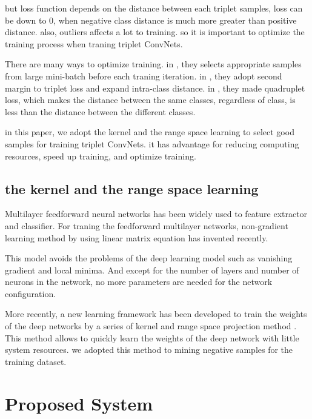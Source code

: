 \documentclass[runningheads]{llncs}
\begin{document}
but loss function depends on the distance between each triplet samples, loss can be down to 0, when negative class distance is much more greater than positive distance. also, outliers affects a lot to training.
so it is important to optimize the training process when traning triplet ConvNets.

There are many ways to optimize training. in \cite{schroff2015facenet}, they selects appropriate samples from large mini-batch before each traning iteration.
in \cite{cheng2016person}, they adopt second margin to triplet loss and expand intra-class distance.
in \cite{chen2017beyond}, they made quadruplet loss, which makes the distance between the same classes, 
regardless of class, is less than the distance between the different classes. 

in this paper, we adopt the kernel and the range space learning to select good samples for training triplet ConvNets.
it has advantage for reducing computing resources, speed up training, and optimize training.

\subsection{the kernel and the range space learning}

Multilayer feedforward neural networks has been widely used to feature extractor and classifier.
For traning the feedforward multilayer networks, non-gradient learning method by using linear matrix equation has invented recently. \cite{wang2018review}

This model avoids the problems of the deep learning model such as vanishing gradient and local minima. And except for the number of layers and number of neurons in the network, no more parameters are needed for the network configuration.

More recently, a new learning framework has been developed to train the weights of the deep networks by a series of kernel and range space projection method \cite{toh2018learning,toh2018gradient}.
This method allows to quickly learn the weights of the deep network with little system resources.
we adopted this method to mining negative samples for the training dataset.

\section{Proposed System}
\end{document}
